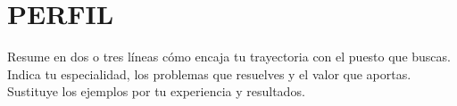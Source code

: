 \section{PERFIL}
Resume en dos o tres líneas cómo encaja tu trayectoria con el puesto que buscas.
Indica tu especialidad, los problemas que resuelves y el valor que aportas.
Sustituye los ejemplos por tu experiencia y resultados.

